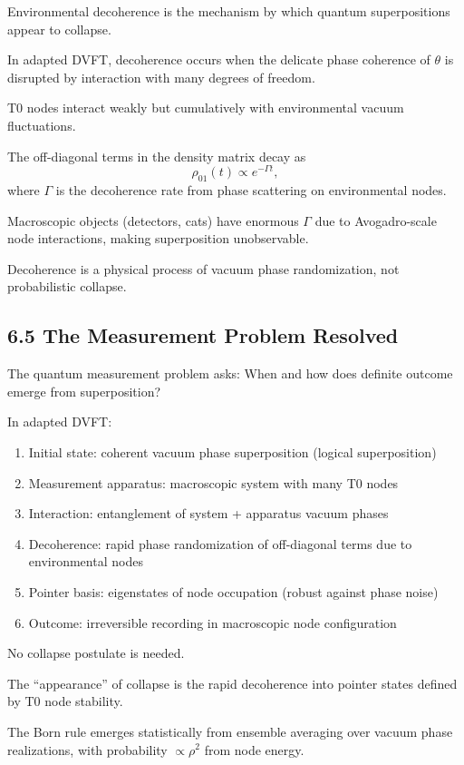 	Environmental decoherence is the mechanism by which quantum superpositions appear to collapse.
	
	In adapted DVFT, decoherence occurs when the delicate phase coherence of $\theta$ is disrupted by interaction with many degrees of freedom.
	
	T0 nodes interact weakly but cumulatively with environmental vacuum fluctuations.
	
	The off-diagonal terms in the density matrix decay as
	\[
	\rho_{01}(t) \propto e^{-\Gamma t},
	\]
	where $\Gamma$ is the decoherence rate from phase scattering on environmental nodes.
	
	Macroscopic objects (detectors, cats) have enormous $\Gamma$ due to Avogadro-scale node interactions, making superposition unobservable.
	
	Decoherence is a physical process of vacuum phase randomization, not probabilistic collapse.
	
	\subsection{6.5 The Measurement Problem Resolved}
	
	The quantum measurement problem asks: When and how does definite outcome emerge from superposition?
	
	In adapted DVFT:
	\begin{enumerate}
		\item Initial state: coherent vacuum phase superposition (logical superposition)
		\item Measurement apparatus: macroscopic system with many T0 nodes
		\item Interaction: entanglement of system + apparatus vacuum phases
		\item Decoherence: rapid phase randomization of off-diagonal terms due to environmental nodes
		\item Pointer basis: eigenstates of node occupation (robust against phase noise)
		\item Outcome: irreversible recording in macroscopic node configuration
	\end{enumerate}
	
	No collapse postulate is needed.
	
	The ``appearance'' of collapse is the rapid decoherence into pointer states defined by T0 node stability.
	
	The Born rule emerges statistically from ensemble averaging over vacuum phase realizations, with probability $\propto \rho^2$ from node energy.
	
